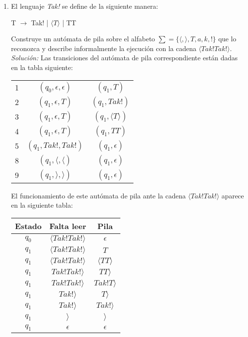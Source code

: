 \documentclass[letterpaper,11pt]{article}
\begin{document}
\begin{enumerate}
       \item El lenguaje \textit{Tak!} se define de la siguiente manera:
       \begin{center}
           T $\rightarrow$ Tak! | $\langle T \rangle$ | TT
       \end{center}
       Construye un autómata de pila sobre el alfabeto 
       $\sum = \{ \langle, \rangle, T, a, k, !\}$ que lo reconozca y describe 
       informalmente la ejecución con la cadena $\langle Tak!Tak! \rangle$.\\
       \textit{Solución:} Las transiciones del autómata de pila correspondiente
       están dadas en la tabla siguiente:
       \begin{center}
           \begin{tabular}{| c | c | c |}
               \hline
               1 & $(q_0, \epsilon, \epsilon)$ & $(q_1, T)$ \\
               2 & $(q_1, \epsilon, T)$ & $(q_1, Tak!)$ \\
               3 & $(q_1, \epsilon, T)$ & $(q_1, \langle T \rangle)$ \\
               4 & $(q_1, \epsilon, T)$ & $(q_1, TT)$ \\
               5 & $(q_1, Tak!, Tak!)$ & $(q_1, \epsilon)$ \\
               8 & $(q_1, \langle, \langle)$ & $(q_1, \epsilon)$ \\
               9 & $(q_1, \rangle, \rangle)$ & $(q_1, \epsilon)$ \\
               \hline
           \end{tabular}
       \end{center}
       
       \newpage
       El funcionamiento de este autómata de pila ante la cadena 
       $\langle Tak!Tak! \rangle$ aparece en la siguiente tabla:
       \begin{center}
           \begin{tabular}{ c | c | c }
               \hline
               Estado & Falta leer & Pila \\
               \hline
               $q_0$ & $\langle Tak!Tak! \rangle$ & $\epsilon$ \\
               $q_1$ & $\langle Tak!Tak! \rangle$ & $T$ \\
               $q_1$ & $\langle Tak!Tak! \rangle$ & $\langle TT \rangle$ \\
               $q_1$ & $ Tak!Tak! \rangle$ & $TT \rangle$ \\
               $q_1$ & $ Tak!Tak! \rangle$ & $Tak!T \rangle$ \\
               $q_1$ & $ Tak! \rangle$ & $ T \rangle$ \\
               $q_1$ & $ Tak! \rangle$ & $ Tak! \rangle$ \\
               $q_1$ & $ \rangle$ & $ \rangle$ \\
               $q_1$ & $\epsilon$ & $\epsilon$ \\
               \hline
           \end{tabular}
       \end{center}
      

\end{enumerate}
\end{document}
